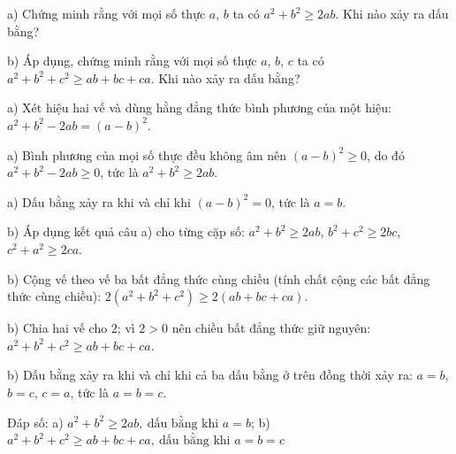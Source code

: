\begin{problem}[9DS-BPT-008]
a) Chứng minh rằng với mọi số thực $a$, $b$ ta có $a^2 + b^2 \geq 2ab$. Khi nào xảy ra dấu bằng?

b) Áp dụng, chứng minh rằng với mọi số thực $a$, $b$, $c$ ta có $a^2 + b^2 + c^2 \geq ab + bc + ca$. Khi nào xảy ra dấu bằng?

\begin{solution}
a) Xét hiệu hai vế và dùng hằng đẳng thức bình phương của một hiệu: $a^2 + b^2 - 2ab = (a - b)^2$.

a) Bình phương của mọi số thực đều không âm nên $(a - b)^2 \geq 0$, do đó $a^2 + b^2 - 2ab \geq 0$, tức là $a^2 + b^2 \geq 2ab$.

a) Dấu bằng xảy ra khi và chỉ khi $(a - b)^2 = 0$, tức là $a = b$.

b) Áp dụng kết quả câu a) cho từng cặp số: $a^2 + b^2 \geq 2ab$, $b^2 + c^2 \geq 2bc$, $c^2 + a^2 \geq 2ca$.

b) Cộng vế theo vế ba bất đẳng thức cùng chiều (tính chất cộng các bất đẳng thức cùng chiều): $2(a^2 + b^2 + c^2) \geq 2(ab + bc + ca)$.

b) Chia hai vế cho $2$; vì $2 > 0$ nên chiều bất đẳng thức giữ nguyên: $a^2 + b^2 + c^2 \geq ab + bc + ca$.

b) Dấu bằng xảy ra khi và chỉ khi cả ba dấu bằng ở trên đồng thời xảy ra: $a = b$, $b = c$, $c = a$, tức là $a = b = c$.

Đáp số: a) $\boxed{a^2 + b^2 \geq 2ab,\ \text{dấu bằng khi } a = b}$; b) $\boxed{a^2 + b^2 + c^2 \geq ab + bc + ca,\ \text{dấu bằng khi } a = b = c}$
\end{solution}
\end{problem}

